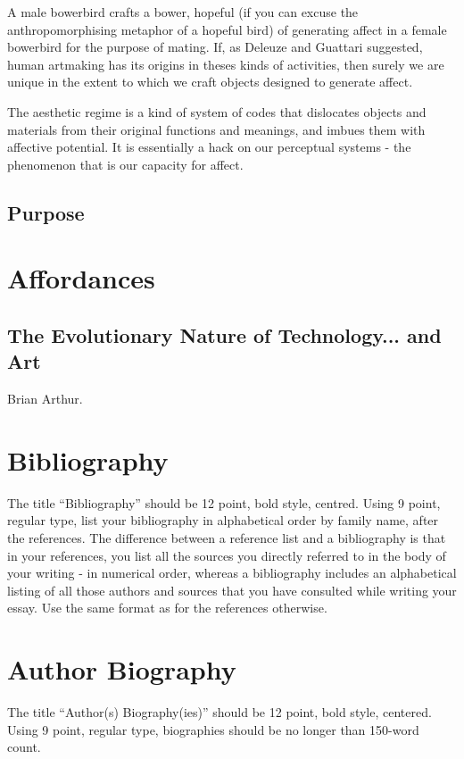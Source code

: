 \documentclass[letterpaper]{article}
\begin{document}
        A male bowerbird crafts a bower, hopeful (if you can excuse the anthropomorphising metaphor of a hopeful bird) of generating affect in a female bowerbird for the purpose of mating. If, as Deleuze and Guattari suggested, human artmaking has its origins in theses kinds of activities, then surely we are unique in the extent to which we craft objects designed to generate affect.
        
        The aesthetic regime is a kind of system of codes that dislocates objects and materials from their original functions and meanings, and imbues them with affective potential. It is essentially a hack on our perceptual systems - the phenomenon that is our capacity for affect.

    \subsection{Purpose}

\section{Affordances}

    \subsection{The Evolutionary Nature of Technology... and Art}

        Brian Arthur.
    





\section{Bibliography}
The title “Bibliography” should be 12 point, bold style, centred. Using 9 point, regular type, list your bibliography in alphabetical order by family name, after the references. The difference between a reference list and a bibliography is that in your references, you list all the sources you directly referred to in the body of your writing - in numerical order, whereas a bibliography includes an alphabetical listing of all those authors and sources that you have consulted while writing your essay. Use the same format as for the references otherwise.

\section{Author Biography}

The title ``Author(s) Biography(ies)'' should be 12 point, bold style, centered. Using 9 point, regular type, biographies should be no longer than 150-word count.
\end{document}
